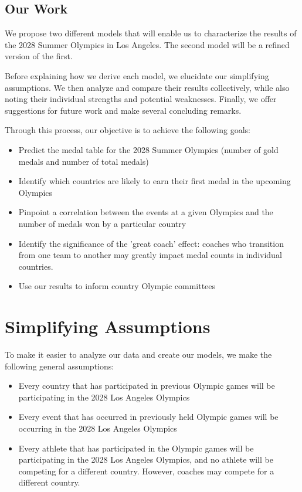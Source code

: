 \documentclass{mcmthesis}
\begin{document}
\subsection{Our Work}
We propose two different models that will enable us to characterize the results of the 2028 Summer Olympics in Los Angeles. The second model will be a refined version of the first. \par Before explaining how we derive each model, we elucidate our simplifying assumptions. We then analyze and compare their results collectively, while also noting their individual strengths and potential weaknesses. Finally, we offer suggestions for future work and make several concluding remarks. \par
Through this process, our objective is to achieve the following goals:
\begin{itemize}
    \item Predict the medal table for the 2028 Summer Olympics (number of gold medals and number of total medals) 
    \item Identify which countries are likely to earn their first medal in the upcoming Olympics
    \item Pinpoint a correlation between the events at a given Olympics and the number of medals won by a particular country
    \item Identify the significance of the 'great coach' effect: coaches who transition from one team to another may greatly impact medal counts in individual countries. 
    \item Use our results to inform country Olympic committees
\end{itemize} 

\newpage

\section{Simplifying Assumptions}
To make it easier to analyze our data and create our models, we make the following general assumptions:
\begin{itemize}
    \item Every country that has participated in previous Olympic games will be participating in the 2028 Los Angeles Olympics
    \item Every event that has occurred in previously held Olympic games will be occurring in the 2028 Los Angeles Olympics
    \item Every athlete that has participated in the Olympic games will be participating in the 2028 Los Angeles Olympics, and no athlete will be competing for a different country. However, coaches may compete for a different country.
\end{itemize}
\end{document}
